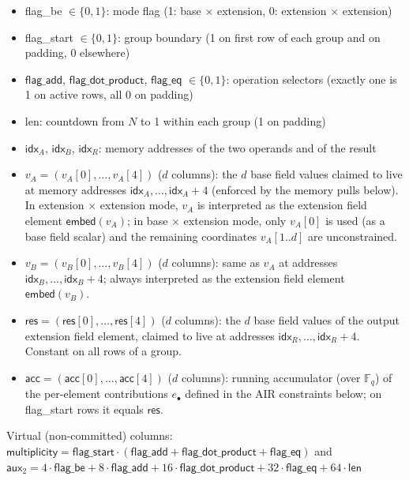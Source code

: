 \documentclass{article}
\theoremstyle{definition}
\newcommand{\Fq}{\mathbb F_q}
\newcommand{\extdeg}{d} %
\begin{document}
\begin{itemize}
    \item \textsf{flag\_be} $\in \{0,1\}$: mode flag (1: base $\times$ extension, 0: extension $\times$ extension)
    \item \textsf{flag\_start} $\in \{0,1\}$: group boundary (1 on first row of each group and on padding, 0 elsewhere)
    \item $\textsf{flag\_add}$, $\textsf{flag\_dot\_product}$, $\textsf{flag\_eq}$ $\in \{0,1\}$: operation selectors (exactly one is 1 on active rows, all 0 on padding)
    \item \textsf{len}: countdown from $N$ to 1 within each group (1 on padding)
    \item $\textsf{idx}_A$, $\textsf{idx}_B$, $\textsf{idx}_R$: memory addresses of the two operands and of the result
    \item $v_A = (v_A[0], \dots, v_A[4])$ ($\extdeg$ columns): the $\extdeg$ base field values claimed to live at memory addresses $\textsf{idx}_A, \dots, \textsf{idx}_A + 4$ (enforced by the memory pulls below). In extension $\times$ extension mode, $v_A$ is interpreted as the extension field element $\mathsf{embed}(v_A)$; in base $\times$ extension mode, only $v_A[0]$ is used (as a base field scalar) and the remaining coordinates $v_A[1..\extdeg]$ are unconstrained.
    \item $v_B = (v_B[0], \dots, v_B[4])$ ($\extdeg$ columns): same as $v_A$ at addresses $\textsf{idx}_B, \dots, \textsf{idx}_B + 4$; always interpreted as the extension field element $\mathsf{embed}(v_B)$.
    \item $\textsf{res} = (\textsf{res}[0], \dots, \textsf{res}[4])$ ($\extdeg$ columns): the $\extdeg$ base field values of the output extension field element, claimed to live at addresses $\textsf{idx}_R, \dots, \textsf{idx}_R + 4$. Constant on all rows of a group.
    \item $\textsf{acc} = (\textsf{acc}[0], \dots, \textsf{acc}[4])$ ($\extdeg$ columns): running accumulator (over $\Fq$) of the per-element contributions $e_\bullet$ defined in the AIR constraints below; on \textsf{flag\_start} rows it equals $\textsf{res}$.
\end{itemize}

Virtual (non-committed) columns: $\textsf{multiplicity} = \textsf{flag\_start} \cdot (\textsf{flag\_add} + \textsf{flag\_dot\_product} + \textsf{flag\_eq})$ and $\textsf{aux}_2 = 4 \cdot \textsf{flag\_be} + 8 \cdot \textsf{flag\_add} + 16 \cdot \textsf{flag\_dot\_product} + 32 \cdot \textsf{flag\_eq} + 64 \cdot \textsf{len}$
\end{document}
